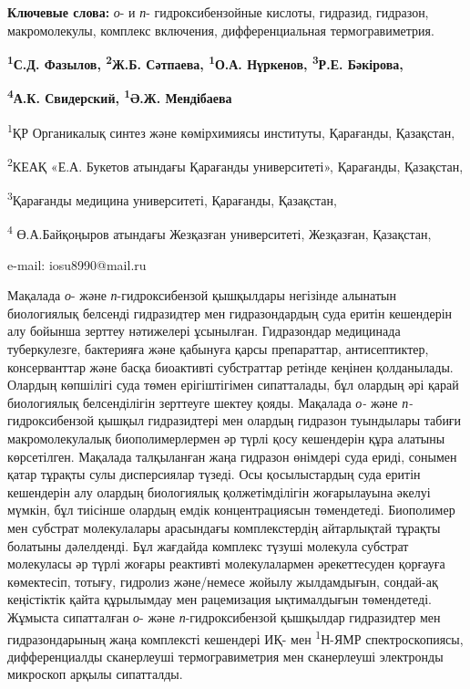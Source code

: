 {\bfseries Ключевые слова:} \emph{о}- и \emph{п}- гидроксибензойные
кислоты, гидразид, гидразон, макромолекулы, комплекс включения,
дифференциальная термогравиметрия.


\begin{center}
{\bfseries \textsuperscript{1}С.Д. Фазылов\envelope, \textsuperscript{2}Ж.Б.
Сәтпаева, \textsuperscript{1}О.А. Нүркенов, \textsuperscript{3}Р.Е.
Бәкірова,}

{\bfseries \textsuperscript{4}А.К. Свидерский, \textsuperscript{1}Ә.Ж.
Мендібаева}

\textsuperscript{1}ҚР Органикалық синтез және көмірхимиясы институты,
Қарағанды, Қазақстан,

\textsuperscript{2}КЕАҚ «Е.А. Букетов атындағы Қарағанды университеті»,
Қарағанды, Қазақстан,

\textsuperscript{3}Қарағанды медицина университеті, Қарағанды,
Қазақстан,

\textsuperscript{4} Ө.А.Байқоңыров атындағы Жезқазған университеті,
Жезқазған, Қазақстан,

e-mail: iosu8990@mail.ru
\end{center}

Мақалада \emph{о}- және \emph{п}-гидроксибензой қышқылдары негізінде
алынатын биологиялық белсенді гидразидтер мен гидразондардың суда еритін
кешендерін алу бойынша зерттеу нәтижелері ұсынылған. Гидразондар
медицинада туберкулезге, бактерияға және қабынуға қарсы препараттар,
антисептиктер, консерванттар және басқа биоактивті субстраттар ретінде
кеңінен қолданылады. Олардың көпшілігі суда төмен ерігіштігімен
сипатталады, бұл олардың әрі қарай биологиялық белсенділігін зерттеуге
шектеу қояды. Мақалада \emph{о-} және \emph{п-}гидроксибензой қышқыл
гидразидтері мен олардың гидразон туындылары табиғи макромолекулалық
биополимерлермен әр түрлі қосу кешендерін құра алатыны көрсетілген.
Мақалада талқыланған жаңа гидразон өнімдері суда ериді, сонымен қатар
тұрақты сулы дисперсиялар түзеді. Осы қосылыстардың суда еритін
кешендерін алу олардың биологиялық қолжетімділігін жоғарылауына әкелуі
мүмкін, бұл тиісінше олардың емдік концентрациясын төмендетеді.
Биополимер мен субстрат молекулалары арасындағы комплекстердің
айтарлықтай тұрақты болатыны дәлелденді. Бұл жағдайда комплекс түзуші
молекула субстрат молекуласы әр түрлі жоғары реактивті молекулалармен
әрекеттесуден қорғауға көмектесіп, тотығу, гидролиз және/немесе жойылу
жылдамдығын, сондай-ақ кеңістіктік қайта құрылымдау мен рацемизация
ықтималдығын төмендетеді. Жұмыста сипатталған \emph{о}- және
\emph{п}-гидроксибензой қышқылдар гидразидтер мен гидразондарының жаңа
комплексті кешендері ИҚ- мен \textsuperscript{1}Н-ЯМР спектроскопиясы,
дифференциалды сканерлеуші термогравиметрия мен сканерлеуші электронды
микроскоп арқылы сипатталды.

